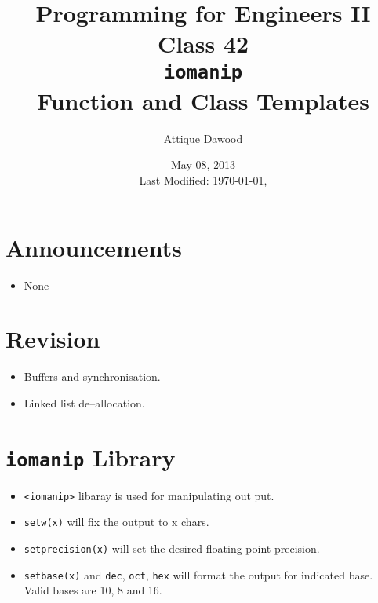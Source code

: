 \documentclass[12pt,a4paper]{article}
\title{\vspace{-2cm}Programming for Engineers II\\Class 42\\\texttt{iomanip}\\Function and Class Templates}
\author{Attique Dawood}
\date{May 08, 2013\\[0.2cm] Last Modified: \today, \currenttime}
\begin{document}
\maketitle
\section{Announcements}
\begin{itemize}
\item None
\end{itemize}
\section{Revision}
\begin{itemize}
\item Buffers and synchronisation.
\item Linked list de--allocation.
\end{itemize}
\section{\texttt{iomanip} Library}
\begin{itemize}
\item \verb|<iomanip>| libaray is used for manipulating out put.
\item \verb|setw(x)| will fix the output to x chars.
\item \verb|setprecision(x)| will set the desired floating point precision.
\item \verb|setbase(x)| and \verb|dec|, \verb|oct|, \verb|hex| will format the output for indicated base. Valid bases are 10, 8 and 16.
\end{itemize}
\end{document}
